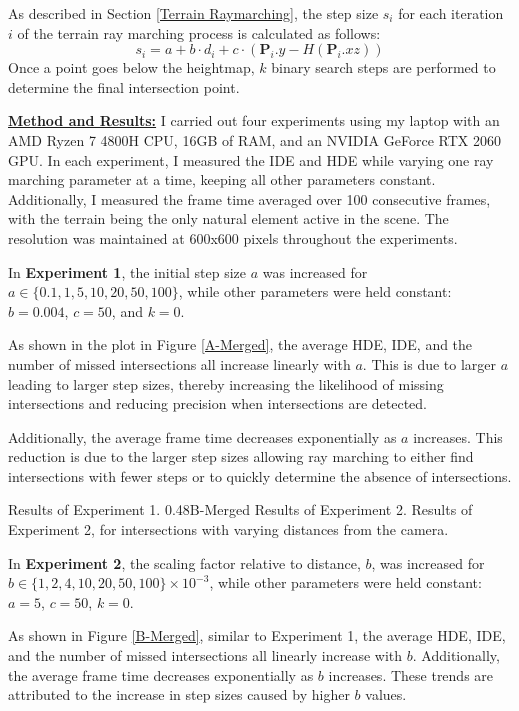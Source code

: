 As described in Section \ref{Terrain Raymarching}, the step size $s_i$ for each iteration $i$ of the terrain ray marching process is calculated as follows:
\begin{equation}
    s_i = a + b \cdot d_i + c \cdot (\mathbf{P}_i.y - H(\mathbf{P}_i.xz))
\end{equation}
Once a point goes below the heightmap, $k$ binary search steps are performed to determine the final intersection point.

\textbf{\underline{Method and Results:}}
I carried out four experiments using my laptop with an AMD Ryzen 7 4800H CPU, 16GB of RAM, and an NVIDIA GeForce RTX 2060 GPU. In each experiment, I measured the IDE and HDE while varying one ray marching parameter at a time, keeping all other parameters constant. Additionally, I measured the frame time averaged over 100 consecutive frames, with the terrain being the only natural element active in the scene. The resolution was maintained at 600x600 pixels throughout the experiments.


In \textbf{Experiment 1}, the initial step size $a$ was increased for $a \in \{0.1, 1, 5, 10, 20, 50, 100\}$, while other parameters were held constant: $b = 0.004$, $c = 50$, and $k = 0$.

As shown in the plot in Figure \ref{A-Merged}, the average HDE, IDE, and the number of missed intersections all increase linearly with $a$. This is due to larger $a$ leading to larger step sizes, thereby increasing the likelihood of missing intersections and reducing precision when intersections are detected.

Additionally, the average frame time decreases exponentially as $a$ increases. This reduction is due to the larger step sizes allowing ray marching to either find intersections with fewer steps or to quickly determine the absence of intersections.

{Results of Experiment 1.}
{0.48}{B-Merged}
{Results of Experiment 2.}
{Results of Experiment 2, for intersections with varying distances from the camera.}

In \textbf{Experiment 2}, the scaling factor relative to distance, $b$, was increased for $b \in \{1, 2, 4, 10, 20, 50, 100\} \times 10^{-3}$, while other parameters were held constant: $a = 5$, $c = 50$, $k = 0$.

As shown in Figure \ref{B-Merged}, similar to Experiment 1, the average HDE, IDE, and the number of missed intersections all linearly increase with $b$. Additionally, the average frame time decreases exponentially as $b$ increases. These trends are attributed to the increase in step sizes caused by higher $b$ values.


